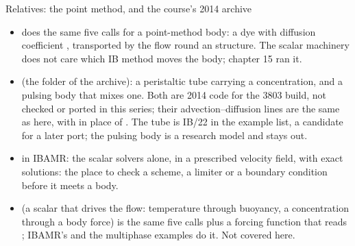 \documentclass[aspectratio=169,11pt]{beamer}
\begin{document}
\begin{frame}{Relatives: the point method, and the course's 2014 archive}
\label{fr:relatives}
\footnotesize
\begin{itemize}
  \item {} does the same five calls for a point-method body: a dye  with diffusion coefficient , transported by the flow round an  structure. The scalar machinery does not care which IB method moves the body; chapter 15 ran it.
  \item {} (the  folder of the archive): a peristaltic tube carrying a concentration, and a pulsing body that mixes one. Both are 2014 code for the 3803 build, not checked or ported in this series; their advection--diffusion lines are the same as here, with  in place of . The tube is IB/22 in the example list, a candidate for a later port; the pulsing body is a research model and stays out.
  \item {} in IBAMR: the scalar solvers alone, in a prescribed velocity field, with exact solutions: the place to check a scheme, a limiter or a boundary condition before it meets a body.
  \item {} (a scalar that drives the flow: temperature through buoyancy, a concentration through a body force) is the same five calls plus a forcing function that reads ; IBAMR's  and the multiphase examples do it. Not covered here.
\end{itemize}
\end{frame}
\end{document}
